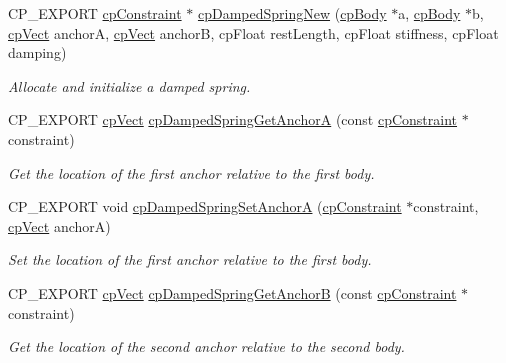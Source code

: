 \begin{DoxyCompactItemize}
C\+P\+\_\+\+E\+X\+P\+O\+RT \hyperlink{structcpConstraint}{cp\+Constraint} $\ast$ \hyperlink{group__cpDampedSpring_gaa1493ee0a6b5a8fbb0cbae5d97da07f8}{cp\+Damped\+Spring\+New} (\hyperlink{structcpBody}{cp\+Body} $\ast$a, \hyperlink{structcpBody}{cp\+Body} $\ast$b, \hyperlink{structcpVect}{cp\+Vect} anchorA, \hyperlink{structcpVect}{cp\+Vect} anchorB, cp\+Float rest\+Length, cp\+Float stiffness, cp\+Float damping)
\begin{DoxyCompactList}\small\item\em Allocate and initialize a damped spring. \end{DoxyCompactList}\item 
\mbox{\label{group__cpDampedSpring_ga6f5deb6e293c3e13130662f234ee475e}} 
C\+P\+\_\+\+E\+X\+P\+O\+RT \hyperlink{structcpVect}{cp\+Vect} \hyperlink{group__cpDampedSpring_ga6f5deb6e293c3e13130662f234ee475e}{cp\+Damped\+Spring\+Get\+AnchorA} (const \hyperlink{structcpConstraint}{cp\+Constraint} $\ast$constraint)
\begin{DoxyCompactList}\small\item\em Get the location of the first anchor relative to the first body. \end{DoxyCompactList}\item 
\mbox{\label{group__cpDampedSpring_gaf096f034a491fc3745ed0324fa1c0cf0}} 
C\+P\+\_\+\+E\+X\+P\+O\+RT void \hyperlink{group__cpDampedSpring_gaf096f034a491fc3745ed0324fa1c0cf0}{cp\+Damped\+Spring\+Set\+AnchorA} (\hyperlink{structcpConstraint}{cp\+Constraint} $\ast$constraint, \hyperlink{structcpVect}{cp\+Vect} anchorA)
\begin{DoxyCompactList}\small\item\em Set the location of the first anchor relative to the first body. \end{DoxyCompactList}\item 
\mbox{\label{group__cpDampedSpring_gaa6cf571d70ab369a6c4068df420a00f1}} 
C\+P\+\_\+\+E\+X\+P\+O\+RT \hyperlink{structcpVect}{cp\+Vect} \hyperlink{group__cpDampedSpring_gaa6cf571d70ab369a6c4068df420a00f1}{cp\+Damped\+Spring\+Get\+AnchorB} (const \hyperlink{structcpConstraint}{cp\+Constraint} $\ast$constraint)
\begin{DoxyCompactList}\small\item\em Get the location of the second anchor relative to the second body. \end{DoxyCompactList}\item 

\end{DoxyCompactItemize}
